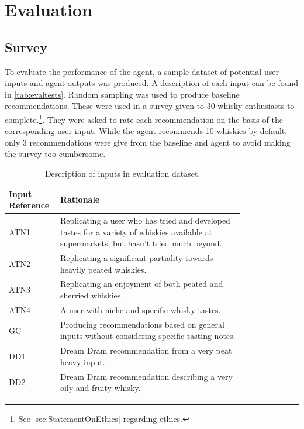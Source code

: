 \section{Evaluation}\label{sec:eval}
\subsection{Survey}\label{sec:survey}
To evaluate the performance of the agent, a sample dataset of potential user inputs and agent outputs 
was produced.  A description of each input can be found in \autoref{tab:evaltests}. Random sampling 
was used to produce baseline recommendations.  These were 
used in a survey given to 30 whisky enthusiasts to complete.\footnote{See \autoref{sec:StatementOnEthics}
regarding ethics.}.
 They were asked to rate each recommendation on the basis of the corresponding user input.  
While the agent recommends 10 whiskies by default, only 3 recommendations were give from the baseline and agent
to avoid making the survey too cumbersome.

\begin{table}
    \centering
    \caption{Description of inputs in evaluation dataset.}\label{tab:evaltests}
    \begin{tabular}{p{0.1\linewidth} p{0.7\linewidth}} 
    \toprule
    Input Reference & Rationale                                                                                                                                 \\ 
    \hline
    ATN1            & Replicating a user who has tried and developed tastes for a variety of whiskies available at supermarkets, but hasn't tried much beyond.  \\
    ATN2            & Replicating a significant partiality towards heavily peated whiskies.                                                                     \\
    ATN3            & Replicating an enjoyment of both peated and sherried whiskies.                                                                            \\
    ATN4            & A user with niche and specific whisky tastes.                                                                                             \\
    GC              & Producing recommendations based on general inputs without considering specific tasting notes.                                            \\
    DD1             & Dream Dram recommendation from a very peat heavy input.                                                                                   \\
    DD2             & Dream Dram recommendation describing a very oily and fruity whisky.                                                                       \\
    \bottomrule
    \end{tabular}
\end{table}

